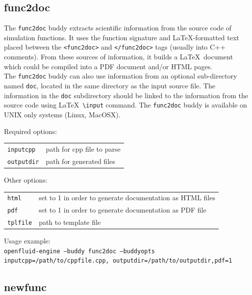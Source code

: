\subsection{func2doc}

The \texttt{func2doc} buddy extracts scientific information from the source code of simulation functions. It uses the function signature and \LaTeX-formatted text placed between the \texttt{<func2doc>} and \texttt{</func2doc>} tags (usually into C++ comments). From these sources of information, it builds a \LaTeX\ document which could be compiled into a PDF document and/or HTML pages.\\
The \texttt{func2doc} buddy can also use information from an optional sub-directory named \texttt{doc}, located in the same directory as the input source file. The information in the \texttt{doc} subdirectory should be linked to the information from the source code using \LaTeX\ \texttt{\textbackslash input} command.  
The \texttt{func2doc} buddy is available on UNIX only systems (Linux, MacOSX).

\bigskip

\noindent Required options:
\begin{center}
\begin{tabularx}{\linewidth}{lX}
\texttt{inputcpp}&path for cpp file to parse\\
\texttt{outputdir}&path for generated files\\
\end{tabularx}
\end{center}

\noindent Other options:
\begin{center}
\begin{tabularx}{\linewidth}{lX}
\texttt{html}&set to 1 in order to generate documentation as HTML files\\
\texttt{pdf}&set to 1 in order to generate documentation as PDF file\\
\texttt{tplfile}&path to template file\\
\end{tabularx}
\end{center}

\bigskip

\noindent Usage example:\\
\texttt{openfluid-engine --buddy func2doc --buddyopts
inputcpp=/path/to/cppfile.cpp, outputdir=/path/to/outputdir,pdf=1}


\subsection{newfunc}


